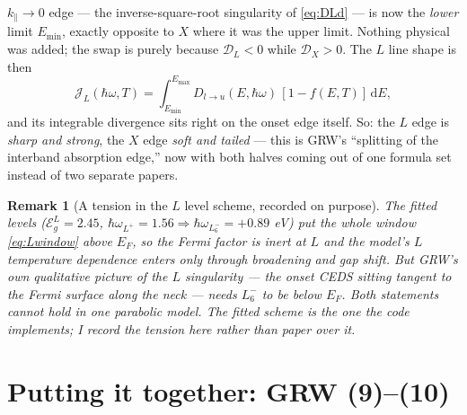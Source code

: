\documentclass[11pt,a4paper]{article}
\numberwithin{equation}{section}
\newcommand{\hw}{\hbar\omega}
\newcommand{\EgL}{\mathcal{E}_g^{L}}
\newcommand{\cD}{\mathcal{D}}
\newcommand{\cJ}{\mathcal{J}}%
\newcommand{\kpar}{k_{\parallel}}
\newcommand{\dd}{\mathrm{d}}
\newcommand{\wLsix}{\hbar\omega_{L_6^-}}
\newcommand{\wLplus}{\hbar\omega_{L^+}}
\newtheorem{remark}{Remark}[section]
\begin{document}
$\kpar\to0$ edge --- the inverse-square-root singularity of
\eqref{eq:DLd} --- is now the \emph{lower} limit $E_{\min}$, exactly
opposite to $X$ where it was the upper limit. Nothing physical was
added; the swap is purely because $\cD_L<0$ while $\cD_X>0$. The $L$
line shape is then
\begin{equation}
\cJ_L(\hw,T)=\int_{E_{\min}}^{E_{\max}}
D_{l\to u}(E,\hw)\,[1-f(E,T)]\,\dd E ,
\end{equation}
and its integrable divergence sits right on the onset edge itself. So:
the $L$ edge is \emph{sharp and strong}, the $X$ edge \emph{soft and
tailed} --- this is GRW's ``splitting of the interband absorption
edge,'' now with both halves coming out of one formula set instead of
two separate papers.

\begin{remark}[A tension in the $L$ level scheme, recorded on purpose]
The fitted levels ($\EgL=2.45$, $\wLplus=1.56\Rightarrow\wLsix=+0.89$
eV) put the whole window \eqref{eq:Lwindow} \emph{above} $E_F$, so the
Fermi factor is inert at $L$ and the model's $L$ temperature
dependence enters only through broadening and gap shift. But GRW's own
\emph{qualitative} picture of the $L$ singularity --- the onset CEDS
sitting tangent to the Fermi surface along the neck --- needs $L_6^-$
to be \emph{below} $E_F$. Both statements cannot hold in one parabolic
model. The fitted scheme is the one the code implements; I record the
tension here rather than paper over it.
\end{remark}

\section{Putting it together: GRW (9)--(10)}\label{sec:eps2}
\end{document}
